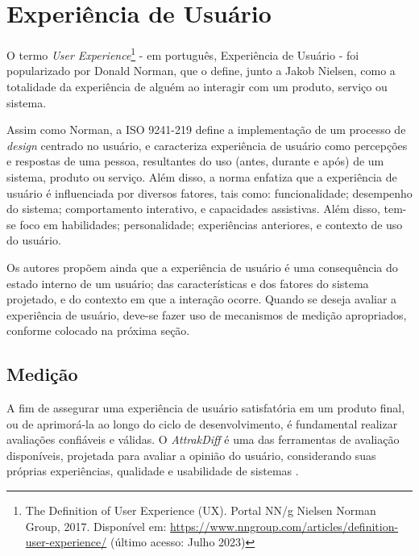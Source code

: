 \section{Experiência de Usuário}
\label{sec:Experiencia de Usuario}

O termo \textit{User Experience}\footnote{The Definition of User Experience (UX). Portal NN/g Nielsen Norman Group, 2017. Disponível
em: \url{https://www.nngroup.com/articles/definition-user-experience/} (último acesso: Julho 2023)} - em português, Experiência de Usuário - foi popularizado por Donald Norman, 
que o define, junto a Jakob Nielsen, como a totalidade da experiência de alguém ao interagir com um produto, serviço ou sistema. 

Assim como Norman, a ISO 9241-219 \cite{iso9241210} define a implementação de um processo de \textit{design} centrado no usuário, e caracteriza experiência de usuário como percepções e 
respostas de uma pessoa, resultantes do uso (antes, durante e após) de um sistema, produto ou serviço. Além disso, a norma enfatiza que a experiência de usuário 
é influenciada por diversos fatores, tais como: funcionalidade; desempenho do sistema; comportamento interativo, e capacidades assistivas. Além disso, tem-se foco em habilidades; 
personalidade; experiências anteriores, e contexto de uso do usuário.

Os autores  propõem ainda que a experiência de usuário é uma consequência do estado interno de um usuário; das características e dos fatores do sistema projetado, 
e do contexto em que a interação ocorre. Quando se deseja avaliar a experiência de usuário, deve-se fazer uso de mecanismos de medição apropriados, conforme colocado na próxima seção.

\subsection{Medição}
\label{sec:Medicao2}

A fim de assegurar uma experiência de usuário satisfatória em um produto final, ou de aprimorá-la ao longo do ciclo de desenvolvimento, é fundamental realizar avaliações confiáveis e válidas. 
O \textit{AttrakDiff} é uma das ferramentas de avaliação disponíveis, projetada para avaliar a opinião do usuário, considerando suas próprias experiências, qualidade e usabilidade de sistemas \cite{hassenzahl2003}. 

